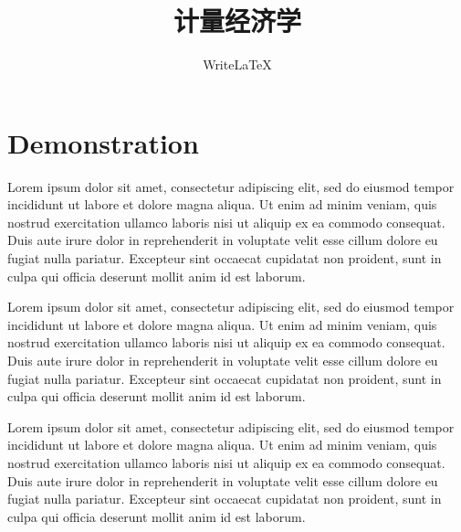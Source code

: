 \documentclass[a4paper]{article}
\begin{document}
\title{计量经济学}
\author{WriteLaTeX}
\maketitle

\section{Demonstration}

Lorem ipsum dolor sit amet, consectetur adipiscing elit, sed do eiusmod tempor incididunt ut labore et dolore magna aliqua. Ut enim ad minim veniam, quis nostrud exercitation ullamco laboris nisi ut aliquip ex ea commodo consequat. \autocite{Ful83} Duis aute irure dolor in reprehenderit in voluptate velit esse cillum dolore eu fugiat nulla pariatur. Excepteur sint occaecat cupidatat non proident, sunt in culpa qui officia deserunt mollit anim id est laborum. \autocite{GMP81}

Lorem ipsum dolor sit amet, consectetur adipiscing elit, sed do eiusmod tempor incididunt ut labore et dolore magna aliqua. \autocite{GMP81} Ut enim ad minim veniam, quis nostrud exercitation ullamco laboris nisi ut aliquip ex ea commodo consequat.  Duis aute irure dolor in reprehenderit in voluptate velit esse cillum dolore eu fugiat nulla pariatur. Excepteur sint occaecat cupidatat non proident, sunt in culpa qui officia deserunt mollit anim id est laborum.

Lorem ipsum dolor sit amet, consectetur adipiscing elit, sed do eiusmod tempor incididunt ut labore et dolore magna aliqua. Ut enim ad minim veniam, quis nostrud exercitation ullamco laboris nisi ut aliquip ex ea commodo consequat. \autocite{Pat85} Duis aute irure dolor in reprehenderit in voluptate velit esse cillum dolore eu fugiat nulla pariatur. \autocite{PP98,PP95} Excepteur sint occaecat cupidatat non proident, sunt in culpa qui officia deserunt mollit anim id est laborum.

\printbibliography
\end{document}
